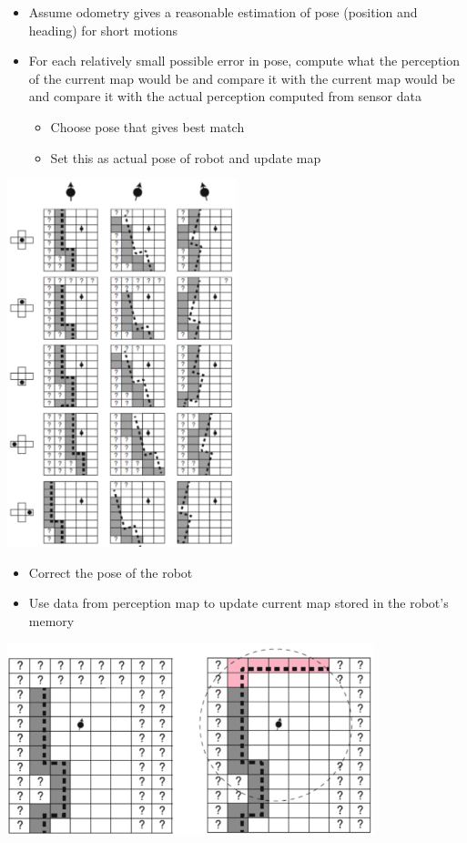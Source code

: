 \documentclass[10pt]{article}
\begin{document}
\begin{itemize}
	\item Assume odometry gives a reasonable estimation of pose (position and heading) for short motions
	\item For each relatively small possible error in pose, compute what the perception of the current map would be and compare it with the current map would be and compare it with the actual perception computed from sensor data
	\begin{itemize}
        \item Choose pose that gives best match
        \item Set this as actual pose of robot and update map
    \end{itemize}
\end{itemize}
\begin{center} 
	\includegraphics*[width=0.5\textwidth]{L2_8.png} 
\end{center}

\begin{itemize}
	\item Correct the pose of the robot
	\item Use data from perception map to update current map stored in the robot's memory
\end{itemize}

\begin{center} 
	\includegraphics*[width=0.8\textwidth]{L2_9.png} 
\end{center}
\end{document}
